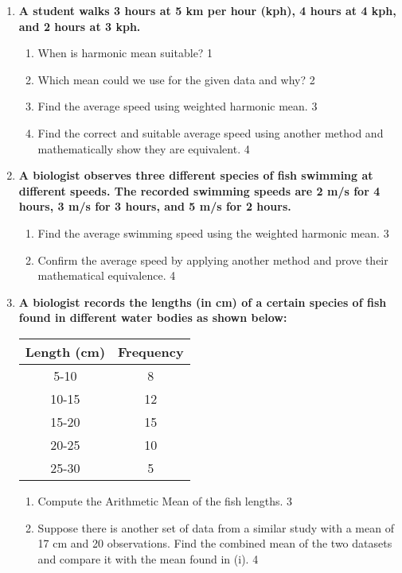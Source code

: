 \documentclass[a4paper,oneside]{book}
\begin{document}
\begin{enumerate}
 \item
	  \textbf{A student walks 3 hours at 5 km per hour (kph), 4 hours at 4 kph, and 2 hours at 3 kph.} 
  
  \begin{enumerate}
    \item
	When is harmonic mean suitable? \hfill 1
    \item
	Which mean could we use for the given data and why? \hfill 2
    \item  
	Find the average speed using weighted harmonic mean. \hfill 3
    \item
	Find the correct and suitable average speed using another method and mathematically show they are equivalent. \hfill 4
  \end{enumerate}
  
  \item
\textbf{A biologist observes three different species of fish swimming at 
different speeds. The recorded swimming speeds are 2 m/s for 4 hours, 
3 m/s for 3 hours, and 5 m/s for 2 hours.}

\begin{enumerate}
    \item  
    Find the average swimming speed using the weighted harmonic mean. \hfill 3
    \item
    Confirm the average speed by applying another method and prove their 
    mathematical equivalence. \hfill 4
\end{enumerate}

\item
\textbf{A biologist records the lengths (in cm) of a certain species of 
fish found in different water bodies as shown below:}

\begin{table}[h]
\centering
\begin{tabular}{c|c}
\textbf{Length (cm)} & \textbf{Frequency} \\ \hline
5-10                 & 8                  \\ \hline
10-15                & 12                 \\ \hline
15-20                & 15                 \\ \hline
20-25                & 10                 \\ \hline
25-30                & 5                  
\end{tabular}
\end{table}

\begin{enumerate}
    \item  
    Compute the Arithmetic Mean of the fish lengths. \hfill 3
    \item
    Suppose there is another set of data from a similar study with a mean of 17 cm and 20 observations. Find the combined mean of the two datasets and compare it with the mean found in (i). \hfill 4
\end{enumerate}


\end{enumerate}
\end{document}
